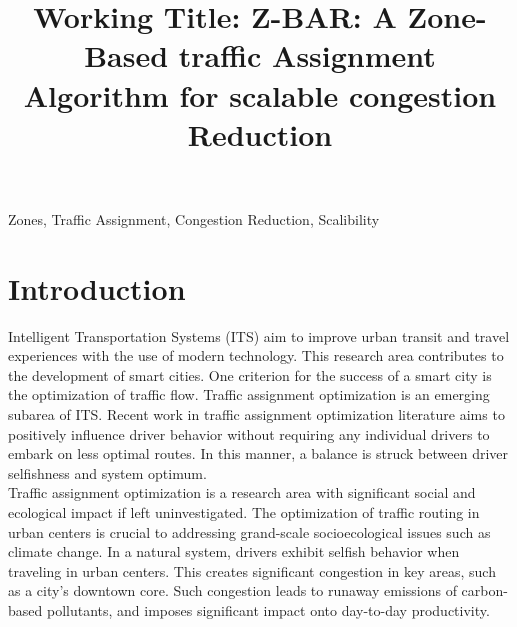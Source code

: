 \documentclass[conference]{IEEEtran}
\begin{document}
\raggedbottom

\title{Working Title: Z-BAR: A Zone-Based traffic Assignment Algorithm for scalable congestion Reduction}

\author{
}

\maketitle

\begin{abstract}


\end{abstract}

\begin{IEEEkeywords}
Zones, Traffic Assignment, Congestion Reduction, Scalibility
\end{IEEEkeywords}

\IEEEpeerreviewmaketitle

\section{Introduction}

Intelligent Transportation Systems (ITS) aim to improve urban transit and travel experiences with the use of modern technology. This research area contributes to the development of smart cities. One criterion for the success of a smart city is the optimization of traffic flow. Traffic assignment optimization is an emerging subarea of ITS. Recent work in traffic assignment optimization literature aims to positively influence driver behavior without requiring any individual drivers to embark on less optimal routes. In this manner, a balance is struck between driver selfishness and system optimum. \\

Traffic assignment optimization is a research area with significant social and ecological impact if left uninvestigated. The optimization of traffic routing in urban centers is crucial to addressing grand-scale socioecological issues such as climate change. In a natural system, drivers exhibit selfish behavior when traveling in urban centers. This creates significant congestion in key areas, such as a city's downtown core. Such congestion leads to runaway emissions of carbon-based pollutants, and imposes significant impact onto day-to-day productivity. \\
\end{document}
